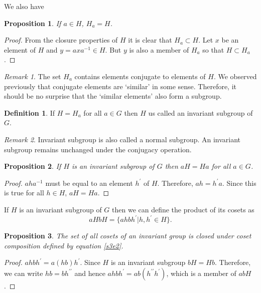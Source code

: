\documentclass{article}
\theoremstyle{plain}
\numberwithin{thm}{section}
\theoremstyle{plain}
\newtheorem{prop}{Proposition}
\numberwithin{prop}{section}
\theoremstyle{definition}
\newtheorem{defn}{Definition}
\numberwithin{defn}{section}
\theoremstyle{remark}
\newtheorem*{rem}{Remark}
\numberwithin{equation}{section}
\begin{document}
We also have
\begin{prop}\label{s3e7}
If $a \in H$, $H_a = H$.
\end{prop}
\begin{proof}
From the closure properties of $H$ it is clear that $H_a \subset H$. Let $x$
be an element of $H$ and $y = axa^{-1} \in H$. But $y$ is also a member of
$H_a$ so that $H \subset H_a$.
\end{proof}

\begin{rem}
The set $H_a$ contains elements conjugate to elements of $H$. We observed
previously that conjugate elements are `similar' in some sense. Therefore, it
should be no surprise that the `similar elements' also form a subgroup.
\end{rem}

\begin{defn}\label{s3d4}
If $H = H_a$ for all $a \in G$ then $H$ us called an invariant subgroup of $G$.
\end{defn}

\begin{rem}
Invariant subgroup is also called a normal subgroup. An invariant subgroup
remains unchanged under the conjugacy operation.
\end{rem}

\begin{prop}\label{s3e8}
If $H$ is an invariant subgroup of $G$ then $aH = Ha$ for all $a \in G$.
\end{prop}
\begin{proof}
$aha^{-1}$ must be equal to an element $h^\prime$ of $H$. Therefore, $ah =
h^\prime a$. Since this is true for all $h \in H$, $aH = Ha$.
\end{proof}

If $H$ is an invariant subgroup of $G$ then we can define the product of its
cosets as
\begin{equation}\label{s3e2}
aHbH  = \{ahbh^\prime | h, h^\prime \in H\}.
\end{equation}

\begin{prop}\label{s3e9}
The set of all cosets of an invariant group is closed under coset composition
defined by equation \eqref{s3e2}.
\end{prop}
\begin{proof}
$ahbh^\prime = a(hb)h^\prime$. Since $H$ is an invariant subgroup $bH = Hb$.
Therefore, we can write $hb = bh^{\prime\prime}$ and hence $ahbh^\prime = 
ab(h^{\prime\prime}h^\prime)$, which is a member of $abH$.
\end{proof}
\end{document}

